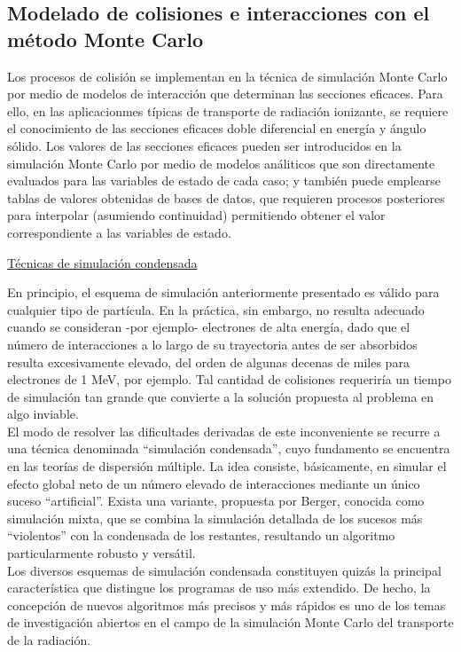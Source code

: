 \subsection{Modelado de colisiones e interacciones con el m\'etodo Monte Carlo}
\label{CapVII_11}

Los procesos de colisi\'on se implementan en la t\'ecnica de simulaci\'on Monte Carlo por medio de modelos de interacci\'on que determinan 
las secciones eficaces.
%
Para ello, en las aplicacionmes t\'ipicas de transporte de radiaci\'on ionizante, se requiere el conocimiento de las secciones eficaces 
doble diferencial en energ\'ia y \'angulo s\'olido. 
%
Los valores de las secciones eficaces pueden ser introducidos en la simulaci\'on Monte Carlo por medio de modelos an\'aliticos que son 
directamente evaluados para las variables de estado de cada caso; y tambi\'en puede emplearse tablas de valores obtenidas de bases de 
datos, que requieren procesos posteriores para interpolar (asumiendo continuidad) permitiendo obtener el valor correspondiente a las 
variables de estado. \\
%
%
\begin{center}
\underline{T\'ecnicas de simulaci\'on condensada}
\end{center}

En principio, el esquema de simulaci\'on anteriormente presentado es v\'alido para cualquier tipo de part\'icula. 
%
En la pr\'actica, sin embargo, no resulta adecuado cuando se consideran -por ejemplo- electrones de alta energ\'ia, dado que el n\'umero 
de interacciones a lo largo de su trayectoria antes de ser absorbidos resulta excesivamente elevado, del orden de algunas decenas de 
miles para electrones de 1 MeV, por ejemplo. 
%
Tal cantidad de colisiones requerir\'ia un tiempo de simulaci\'on tan grande que convierte a la soluci\'on propuesta al problema en algo 
inviable. \\
%
%
El modo de resolver las dificultades derivadas de este inconveniente se recurre a una t\'ecnica denominada ``simulaci\'on condensada'', 
cuyo fundamento se encuentra en las teor\'ias de dispersi\'on m\'ultiple. 
%
La idea consiste, b\'asicamente, en simular el efecto global neto de un n\'umero elevado de interacciones mediante un \'unico suceso 
``artificial''. 
%
Exista una variante, propuesta por Berger, conocida como simulaci\'on mixta, que se combina la simulaci\'on detallada de los sucesos m\'as 
``violentos'' con la condensada de los restantes, resultando un algoritmo particularmente robusto y vers\'atil. \\
%
%
Los diversos esquemas de simulaci\'on condensada constituyen quiz\'as la principal caracter\'istica que distingue los programas de uso 
m\'as extendido. 
%
De hecho, la concepci\'on de nuevos algoritmos m\'as precisos y m\'as r\'apidos es uno de los temas de investigaci\'on abiertos en el 
campo de la simulaci\'on Monte Carlo del transporte de la radiaci\'on. \\
%
%
\vspace{1.0cm}

